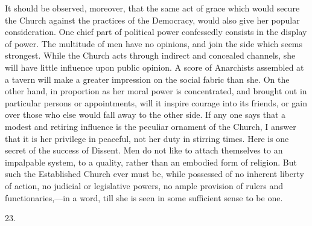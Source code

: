 It should be observed, moreover, that the same
act of grace which would secure the Church against the practices of
the Democracy, would also give her popular consideration. One chief
part of political power confessedly consists in the display of power.
The multitude of men have no opinions, and join the side which seems
strongest. While the Church acts through indirect and concealed
channels, she will have little influence upon public opinion. A score
of Anarchists assembled at a tavern will make a greater impression on
the social fabric than she. On the other hand, in proportion as her
moral power is concentrated, and brought out in particular persons or
appointments, will it inspire courage into its friends, or gain over
those who else would fall away to the other side. If any one says
that a modest and retiring influence is the peculiar ornament of the
Church, I answer that it is her privilege in peaceful, not her duty in
stirring times. Here is one secret of the success of Dissent. Men do
not like to attach themselves to an impalpable system, to a quality,
rather than an embodied form of religion. But such the Established
Church ever must be, while possessed of no inherent liberty of action,
no judicial or legislative powers, no ample provision of rulers and
functionaries,—in a word, till she is seen in some sufficient sense
to be one.

23.

